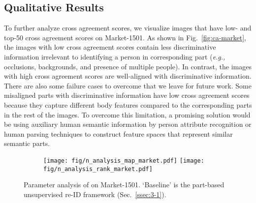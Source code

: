 \documentclass[10pt,twocolumn,letterpaper]{article}
\begin{document}
    
\subsection{Qualitative Results}
{
    To further analyze cross agreement scores, we visualize images that have low- and top-50 cross agreement scores on Market-1501.
    As shown in Fig.~\ref{fig:ca-market}, the images with low cross agreement scores contain less discriminative information irrelevant to identifying a person in corresponding part (\textit{e.g.,} occlusions, backgrounds, and presence of multiple people).
    In contrast, the images with high cross agreement scores are well-aligned with discriminative information.
    There are also some failure cases to overcome that we leave for future work.
    Some misaligned parts with discriminative information have low cross agreement scores because they capture different body features compared to the corresponding parts in the rest of the images.
    To overcome this limitation, a promising solution would be using auxiliary human semantic information by person attribute recognition or human parsing techniques to construct feature spaces that represent similar semantic parts.
}

    \begin{figure}[t]
    \centering
    \begin{subfigure}{\columnwidth}
      \centering
      \texttt{[image: fig/n\_analysis\_map\_market.pdf]} 
      \hfill
      \texttt{[image: fig/n\_analysis\_rank\_market.pdf]} 
      \label{fig:n_analysis_market}       
    \end{subfigure}
    \caption{
    Parameter analysis of  on Market-1501.
    `Baseline' is the part-based unsupervised re-ID framework (Sec.~\ref{ssec:3-1}).
    }
    \label{fig:n_analysis}  
    \end{figure}
    \vspace{-3mm}
    
\end{document}

